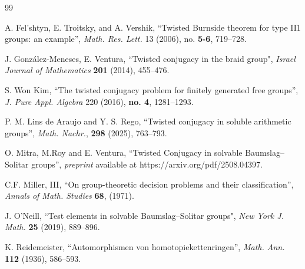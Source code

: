 \documentclass[a4paper]{amsart}
\theoremstyle{definition}
\newcommand{\QQ}{{\mathbb Q}}
\begin{document}
\begin{thebibliography}{99}



 A. Fel'shtyn, E. Troitsky, and A. Vershik, ``Twisted Burnside theorem for type II1 groups: an example'', \textit{Math. Res. Lett.} 13 (2006), no. \textbf{5-6}, 719--728.

 J. Gonz\'{a}lez-Meneses, E. Ventura, ``Twisted conjugacy in the braid group", \emph{Israel Journal of Mathematics} \textbf{201} (2014), 455--476.

 S. Won Kim, ``The twisted conjugacy problem for finitely generated free groups'', \textit{J. Pure Appl. Algebra} 220 (2016), \textbf{no. 4}, 1281--1293.

 P. M. Lins de Araujo and Y. S. Rego, ``Twisted conjugacy in soluble arithmetic groups'', \emph{Math. Nachr.}, \textbf{298} (2025), 763--793. 

 O. Mitra, M.Roy and E. Ventura, ``Twisted Conjugacy in solvable Baumslag--Solitar groups'', \textit{preprint} available at https://arxiv.org/pdf/2508.04397.

 C.F. Miller, III, ``On group-theoretic decision problems and their classification'', \textit{Annals of Math. Studies} \textbf{68}, (1971).

 J. O'Neill, ``Test elements in solvable Baumslag--Solitar groups", \textit{New York J. Math.} \textbf{25} (2019), 889--896.

 K. Reidemeister, ``Automorphismen von homotopiekettenringen'', \textit{Math. Ann.} \textbf{112} (1936), 586--593.

\end{thebibliography}

\end{document}
